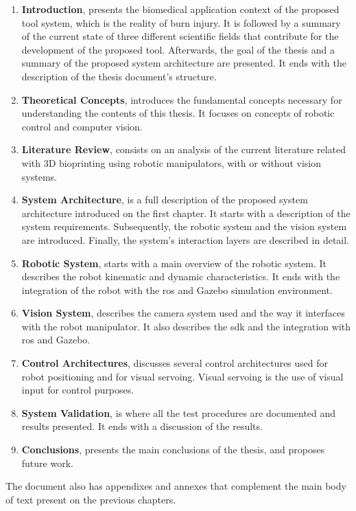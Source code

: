 \begin{enumerate}
    \item \textbf{Introduction}, presents the biomedical application context of the proposed tool system, which is the reality of burn injury. It is followed by a summary of the current state of three different scientific fields that contribute for the development of the proposed tool. Afterwards, the goal of the thesis and a summary of the proposed system architecture are presented. It ends with the description of the thesis document's structure.
    
    \item \textbf{Theoretical Concepts}, introduces the fundamental concepts necessary for understanding the contents of this thesis. It focuses on concepts of robotic control and computer vision. 
    
    \item \textbf{Literature Review}, consists on an analysis of the current literature related with 3D bioprinting using robotic manipulators, with or without vision systems.
    
    \item \textbf{System Architecture}, is a full description of the proposed system architecture introduced on the first chapter. It starts with a description of the system requirements. Subsequently, the robotic system and the vision system are introduced. Finally, the system's interaction layers are described in detail.
    
    \item \textbf{Robotic System}, starts with a main overview of the robotic system. It describes the robot kinematic and dynamic characteristics. It ends with the integration of the robot with the \gls{ros} and Gazebo simulation environment.
    
    \item \textbf{Vision System}, describes the camera system used and the way it interfaces with the robot manipulator. It also describes the \gls{sdk} and the integration with \gls{ros} and Gazebo.
    
    \item \textbf{Control Architectures}, discusses several control architectures used for robot positioning and for visual servoing. Visual servoing is the use of visual input for control purposes.
    
    \item \textbf{System Validation}, is where all the test procedures are documented and results presented. It ends with a discussion of the results.
    
    \item \textbf{Conclusions}, presents the main conclusions of the thesis, and proposes future work.
\end{enumerate}

The document also has appendixes and annexes that complement the main body of text present on the previous chapters.

